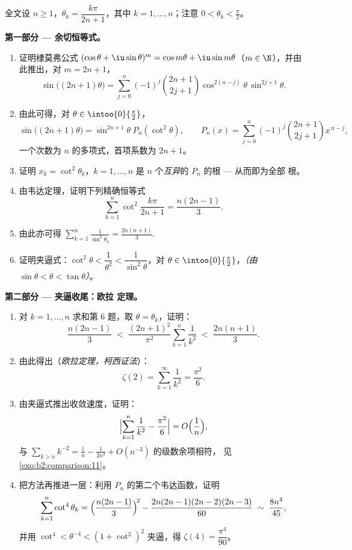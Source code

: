 \begin{problem}[{周末问题 --- $\zeta(2) = \pi^2/6$ 与
伯特兰全景}]
\label{pb:b2:series:1}
全文设 $n \geq 1$，$\theta_k = \dfrac{k\pi}{2n+1}$，其中 $k
= 1, \dots, n$；注意 $0 < \theta_k < \frac\pi2$。

\medskip
\noindent\textbf{第一部分 --- 余切恒等式。}
\begin{enumerate}
  \item 证明棣莫弗公式 $(\cos\theta +
        \iu\sin\theta)^m = \cos m\theta + \iu\sin m\theta$（$m
        \in \N$），并由此推出，对 $m = 2n + 1$，
        \[
        \sin\bigl((2n{+}1)\theta\bigr) = \sum_{j=0}^{n}
        (-1)^j\binom{2n+1}{2j+1}\cos^{2(n-j)}\theta\,
        \sin^{2j+1}\theta .
        \]
  \item 由此可得，对 $\theta \in \intoo{0}{\frac\pi2}$，
        \[
        \sin\bigl((2n{+}1)\theta\bigr) =
        \sin^{2n+1}\theta\; P_n(\cot^2\theta),
        \qquad
        P_n(x) = \sum_{j=0}^{n}
        (-1)^j\binom{2n+1}{2j+1}x^{\,n-j},
        \]
        一个次数为 $n$ 的多项式，首项系数为 $2n
        + 1$。
  \item 证明 $x_k = \cot^2\theta_k$，$k = 1, \dots, n$ 是
        $n$ 个\emph{互异}的 $P_n$ 的根 --- 从而即为全部
        根。
  \item 由韦达定理，证明下列精确恒等式
        \[
        \sum_{k=1}^{n} \cot^2\frac{k\pi}{2n+1}
        = \frac{n(2n-1)}{3}.
        \]
  \item 由此亦可得 $\displaystyle\sum_{k=1}^{n}
        \frac{1}{\sin^2\theta_k} = \frac{2n(n+1)}{3}$.
  \item 证明夹逼式：$\cot^2\theta < \dfrac1{\theta^2} <
        \dfrac{1}{\sin^2\theta}$，对 $\theta \in
        \intoo{0}{\frac\pi2}$，\emph{（由 $\sin\theta < \theta <
        \tan\theta$）}。
\end{enumerate}

\medskip
\noindent\textbf{第二部分 --- 夹逼收尾：欧拉
定理。}
\begin{enumerate}[resume]
  \item 对 $k = 1, \dots, n$ 求和第 6 题，取 $\theta =
        \theta_k$，证明：
        \[
        \frac{n(2n-1)}{3} \;<\;
        \frac{(2n+1)^2}{\pi^2}\sum_{k=1}^{n}\frac1{k^2}
        \;<\; \frac{2n(n+1)}{3}.
        \]
  \item 由此得出（\emph{欧拉定理，柯西证法}）：
        \[
        \zeta(2) = \sum_{k=1}^{\infty}\frac{1}{k^2} =
        \frac{\pi^2}{6}.
        \]
  \item 由夹逼式推出收敛速度，证明：
        \[
        \Bigl|\sum_{k=1}^{n}\frac1{k^2} - \frac{\pi^2}6\Bigr|
        = O\Bigl(\frac1n\Bigr),
        \]
        与 $\sum_{k>n}k^{-2} =
        \frac1n - \frac{1}{2n^2} + O(n^{-3})$ 的级数余项相符，
        见\cref{exo:b2:comparison:11}。
  \item 把方法再推进一层：利用
        $P_n$ 的第二个韦达函数，证明
        \[
        \sum_{k=1}^{n}\cot^4\theta_k =
        \Bigl(\frac{n(2n-1)}3\Bigr)^{\!2} -
        \frac{2n(2n-1)(2n-2)(2n-3)}{60}
        \;\sim\; \frac{8n^4}{45},
        \]
        并用 $\cot^4 < \theta^{-4} < (1 +
        \cot^2)^2$ 夹逼，得 $\zeta(4) = \dfrac{\pi^4}{90}$。
\end{enumerate}


\end{problem}
